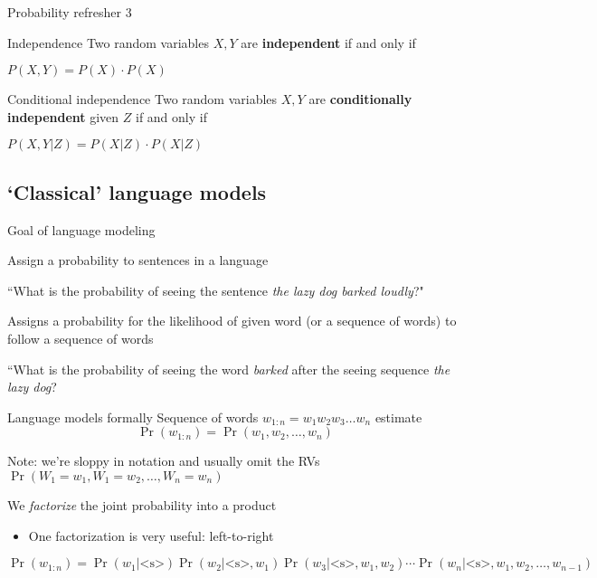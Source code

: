 \documentclass[12pt,aspectratio=169,handout]{beamer}
\begin{document}
\begin{frame}{Probability refresher 3}
	
	\begin{block}{Independence}
			Two random variables $X, Y$ are \textbf{independent} if and only if
			
			$P(X, Y) = P(X) \cdot P(X)$
		\end{block}
	
\pause
	
	\begin{block}{Conditional independence}
			Two random variables $X, Y$ are \textbf{conditionally independent} given $Z$ if and only if
					
			$P(X, Y | Z) = P(X|Z) \cdot P(X|Z)$
		\end{block}
	
\end{frame}


\subsection{`Classical' language models}

\begin{frame}{Goal of language modeling}
	
Assign a probability to sentences in a language

\begin{example}
``What is the probability of seeing the sentence \emph{the lazy dog barked loudly}?"
\end{example}

Assigns a probability for the likelihood of given word (or a sequence of words) to follow a sequence of words

\begin{example}
``What is the probability of seeing the word \emph{barked} after the seeing sequence \emph{the lazy dog}?
\end{example}
	
\end{frame}

\begin{frame}{Language models formally}
Sequence of words $w_{1:n} = w_1 w_2 w_3 \ldots w_n$ estimate
$$
\Pr(w_{1:n}) = \Pr(w_1, w_2, \ldots, w_n)
$$
\begin{block}{Note: we're sloppy in notation and usually omit the RVs}
$\Pr(W_1 = w_1, W_1 = w_2, \ldots, W_n = w_n)$
\end{block}

We \emph{factorize} the joint probability into a product
\begin{itemize}
	\item One factorization is very useful: left-to-right
\end{itemize}
$$
\Pr(w_{1:n}) = \Pr(w_1 | \text{<s>}) \Pr (w_2 | \text{<s>}, w_1) \Pr(w_3 | \text{<s>}, w_1, w_2) \cdots \Pr(w_n | \text{<s>}, w_1, w_2, \ldots, w_{n-1})
$$

\end{frame}
\end{document}
